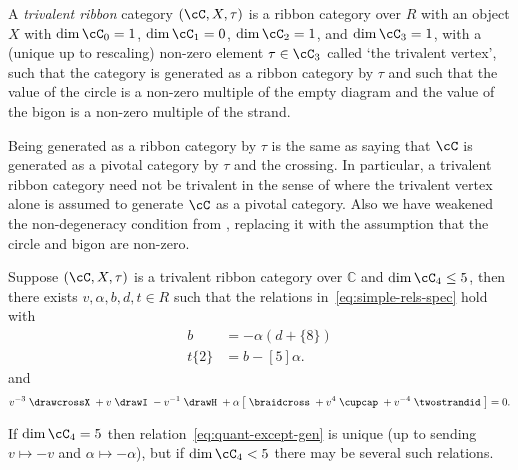 \documentclass[12pt]{amsart}
\begin{document}

\begin{definition}
A \emph{trivalent ribbon} category $(\cC, X, \tau)$ is a ribbon category over
$R$ with  an object $X$ with $\dim \cC_0 = 1$, $\dim \cC_1 = 0$, $\dim{\cC_2}
= 1$, and $\dim{\cC_3} = 1$,  with a (unique up to rescaling) non-zero element
$\tau \in \cC_3$ called `the trivalent vertex', such that the category is
generated as a ribbon category by $\tau$ and such that the value of the circle
is a non-zero multiple of the empty diagram and the value of the bigon is a
non-zero multiple of the strand.
\end{definition}

Being generated as a ribbon category by $\tau$ is the same as saying that
$\cC$ is generated as a pivotal category by $\tau$ and the crossing.  In
particular, a trivalent ribbon category need not be trivalent in the sense of
\cite{MR3624901} where the trivalent vertex alone is assumed to generate $\cC$ 
as a pivotal category.  Also we have weakened the non-degeneracy condition from
\cite{MR3624901}, replacing it with the assumption that the circle and bigon
are non-zero.

\begin{theorem} \label{thm:Jacobi}
Suppose $(\cC, X, \tau)$ is a trivalent ribbon category over
$\mathbb{C}$ and $\dim{\cC_4} \leq 5$, then there exists $v, \alpha,
b, d, t \in R$ such that the relations in~\eqref{eq:simple-rels-spec}
hold with
\begin{align*}
  [5] b &= - \alpha (d+\{8\}) \\
  t \{2\} &= b-[5] \alpha.
\end{align*}
and
\begin{equation}
v^{-3} \;
\drawcrossX
\;+ v \;
\drawI
\; -v^{-1} \;
 \drawH
\;
 + \alpha
\left[\; \braidcross \;
 + v^{4}\;
\cupcap
\; + v^{-4} \;
 \twostrandid \;
 \right] = 0.\label{eq:quant-except-gen}
\end{equation}
\end{theorem}

If $\dim{\cC_4} = 5$ then relation~\eqref{eq:quant-except-gen} is
unique (up to sending $v \mapsto -v$ and $\alpha \mapsto -\alpha$),
but if $\dim{\cC_4} < 5$ there may be several such relations.
\end{document}
